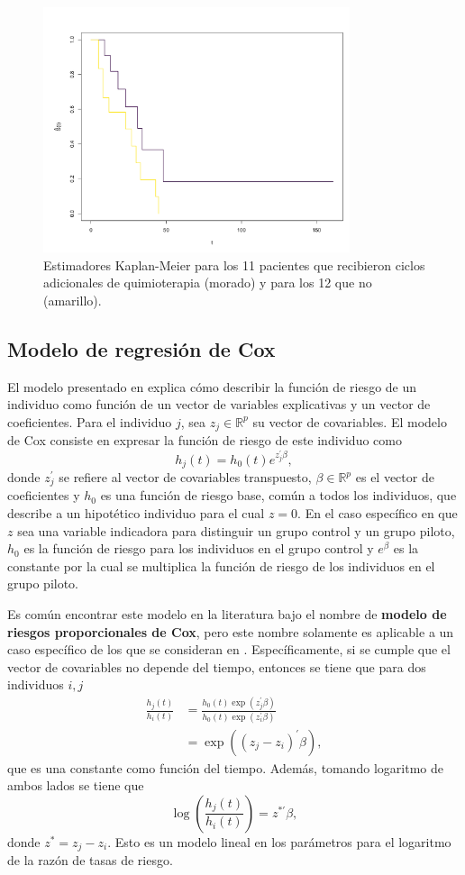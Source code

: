 \documentclass[11pt,a4paper]{article}
\begin{document}
\begin{figure}[htb]
\centering\includegraphics[width=9cm]{km2.png}
\caption{Estimadores Kaplan-Meier para los 11 pacientes que recibieron ciclos adicionales de quimioterapia (morado) y para los 12 que no (amarillo).}
\label{fig:km2}
\end{figure}

\clearpage

\subsection{Modelo de regresión de Cox}
\label{seccion_coxph}
El modelo presentado en \citet{cox} explica cómo describir la función de riesgo de un individuo como función de un vector de variables explicativas y un vector de coeficientes. Para el individuo $j$, sea $z_j\in \mathbb{R}^p$ su vector de covariables. El modelo de Cox consiste en expresar la función de riesgo de este individuo como
\begin{equation} \label{cox_ph}
h_j(t) = h_0(t)e^{z_j^\prime \beta},
\end{equation}
donde $z_j^\prime$ se refiere al vector de covariables transpuesto, $\beta\in \mathbb{R}^p$ es el vector de coeficientes y $h_0$ es una función de riesgo base, común a todos los individuos, que describe a un hipotético individuo para el cual $z = 0$. En el caso específico en que $z$ sea una variable indicadora para distinguir un grupo control y un grupo piloto, $h_0$ es la función de riesgo para los individuos en el grupo control y $e^\beta$ es la constante por la cual se multiplica la función de riesgo de los individuos en el grupo piloto.

Es común encontrar este modelo en la literatura bajo el nombre de \textbf{modelo de riesgos proporcionales de Cox}, pero este nombre solamente es aplicable a un caso específico de los que se consideran en \citet{cox}. Específicamente, si se cumple que el vector de covariables no depende del tiempo, entonces se tiene que para dos individuos $i, j$
\begin{align}
\label{eq:prop_haz}
\frac{h_j(t)}{h_i(t)} &= \frac{h_0(t)\exp (z_j^\prime \beta)}{h_0(t)\exp (z_i^\prime \beta)} \nonumber \\
&= \exp ((z_j-z_i)^\prime \beta),
\end{align}
que es una constante como función del tiempo. Además, tomando logaritmo de ambos lados se tiene que
$$\log \left(\frac{h_j(t)}{h_i(t)}\right) = z^{*\prime} \beta,$$ donde $z^* = z_j-z_i$. Esto es un modelo lineal en los parámetros para el logaritmo de la razón de tasas de riesgo.
\end{document}
